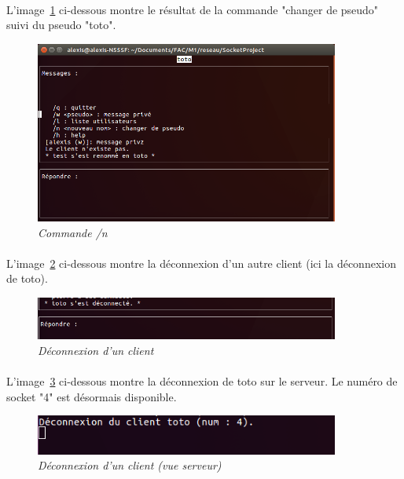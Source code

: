     \FloatBarrier
    
    \paragraph{}
    L'image~\ref{fig:cmd_renommage} ci-dessous montre le résultat de la commande "changer de pseudo" suivi du pseudo "toto".
    \begin{figure}[!htpb]
        \centering
        \includegraphics[width=10cm]{captures/cmd_renommage.png}
        \caption{\textit{Commande /n}}
        \label{fig:cmd_renommage}
    \end{figure}
    
    \FloatBarrier
    
    \paragraph{}
    L'image~\ref{fig:deconnexion_client} ci-dessous montre la déconnexion d'un autre client (ici la déconnexion de toto).
    \begin{figure}[!htpb]
        \centering
        \includegraphics[width=10cm]{captures/deconnexion_client.png}
        \caption{\textit{Déconnexion d'un client}}
        \label{fig:deconnexion_client}
    \end{figure}
    
    \FloatBarrier
    
    \paragraph{}
    L'image~\ref{fig:deconnexion_serveur} ci-dessous montre la déconnexion de toto sur le serveur. Le numéro de socket "4" est désormais disponible.
    \begin{figure}[!htpb]
        \centering
        \includegraphics[width=10cm]{captures/deconnexion_serveur.png}
        \caption{\textit{Déconnexion d'un client (vue serveur)}}
        \label{fig:deconnexion_serveur}
    \end{figure}